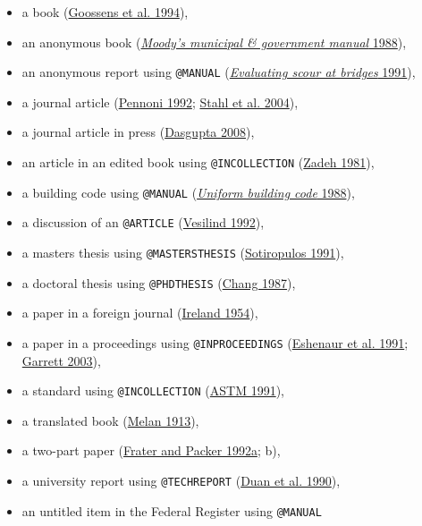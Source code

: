 \documentclass[
  NewProceedings,
  letterpaper]{./assets/ascelike-new}
\begin{document}
\begin{itemize}
\item
  a book (\protect\hyperlink{ref-Goossens:1994a}{Goossens et al. 1994}),
\item
  an anonymous book (\protect\hyperlink{ref-Moody:1988a}{\emph{Moody's
  municipal \& government manual} 1988}),
\item
  an anonymous report using \texttt{@MANUAL}
  (\protect\hyperlink{ref-FHWA:1991a}{\emph{Evaluating scour at bridges}
  1991}),
\item
  a journal article (\protect\hyperlink{ref-Pennoni:1992a}{Pennoni
  1992}; \protect\hyperlink{ref-Stahl:2004a}{Stahl et al. 2004}),
\item
  a journal article in press
  (\protect\hyperlink{ref-Dasgupta:2008a}{Dasgupta 2008}),
\item
  an article in an edited book using \texttt{@INCOLLECTION}
  (\protect\hyperlink{ref-Zadeh:1981a}{Zadeh 1981}),
\item
  a building code using \texttt{@MANUAL}
  (\protect\hyperlink{ref-ICBO:1988a}{\emph{Uniform building code}
  1988}),
\item
  a discussion of an \texttt{@ARTICLE}
  (\protect\hyperlink{ref-Vesilind:1992a}{Vesilind 1992}),
\item
  a masters thesis using \texttt{@MASTERSTHESIS}
  (\protect\hyperlink{ref-Sotiropulos:1991a}{Sotiropulos 1991}),
\item
  a doctoral thesis using \texttt{@PHDTHESIS}
  (\protect\hyperlink{ref-Chang:1987a}{Chang 1987}),
\item
  a paper in a foreign journal
  (\protect\hyperlink{ref-Ireland:1954a}{Ireland 1954}),
\item
  a paper in a proceedings using \texttt{@INPROCEEDINGS}
  (\protect\hyperlink{ref-Eshenaur:1991a}{Eshenaur et al. 1991};
  \protect\hyperlink{ref-Garrett:2003a}{Garrett 2003}),
\item
  a standard using \texttt{@INCOLLECTION}
  (\protect\hyperlink{ref-ASTM:1991a}{ASTM 1991}),
\item
  a translated book (\protect\hyperlink{ref-Melan:1913a}{Melan 1913}),
\item
  a two-part paper (\protect\hyperlink{ref-Frater:1992a}{Frater and
  Packer 1992a}; b),
\item
  a university report using \texttt{@TECHREPORT}
  (\protect\hyperlink{ref-Duan:1990a}{Duan et al. 1990}),
\item
  an untitled item in the Federal Register using \texttt{@MANUAL}

\end{itemize}
\end{document}

